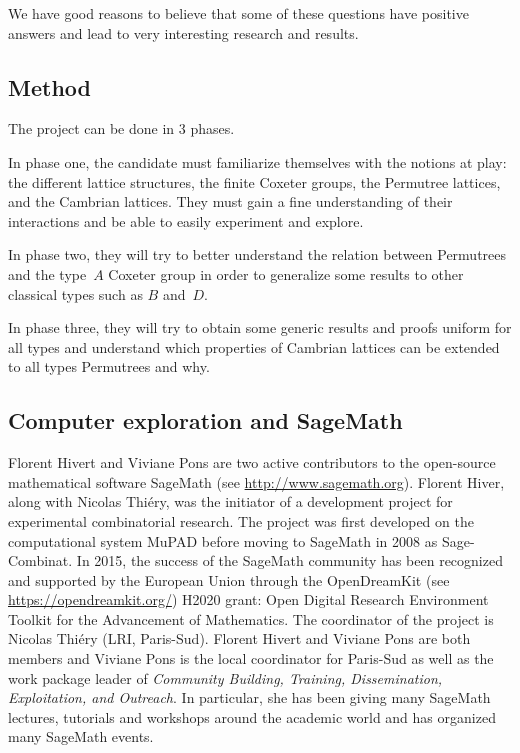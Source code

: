 \documentclass[a4paper,12pt]{article}
\begin{document}
We have good reasons to believe that some of these questions have positive answers and lead to very interesting research and results. 

\subsection{Method}

The project can be done in 3 phases.

In phase one, the candidate must familiarize themselves with the notions at play: the different lattice structures, the finite Coxeter groups, the Permutree lattices, and the Cambrian lattices. They must gain a fine understanding of their interactions and be able to easily experiment and explore.

In phase two, they will try to better understand the relation between Permutrees and the type~$A$ Coxeter group in order to generalize some results to other classical types such as $B$ and~$D$. 

In phase three, they will try to obtain some generic results and proofs uniform for all types and understand which properties of Cambrian lattices can be extended to all types Permutrees and why. 

\subsection{Computer exploration and SageMath}

Florent Hivert and Viviane Pons are two active contributors to the open-source mathematical software SageMath (see \url{http://www.sagemath.org}). Florent Hiver, along with Nicolas Thiéry, was the initiator of a development project for experimental combinatorial research. The project was first developed on the computational system MuPAD before moving to SageMath in 2008 as Sage-Combinat. In 2015, the success of the SageMath community has been recognized and supported by the European Union through the OpenDreamKit (see \url{https://opendreamkit.org/}) H2020 grant: Open Digital Research Environment Toolkit for the Advancement of Mathematics. The coordinator of the project is Nicolas Thiéry (LRI, Paris-Sud). Florent Hivert and Viviane Pons are both members and Viviane Pons is the local coordinator for Paris-Sud as well as the work package leader of \emph{Community Building, Training, Dissemination, Exploitation, and Outreach}. In particular, she has been giving many SageMath lectures, tutorials and workshops around the academic world and has organized many SageMath events.
\end{document}
